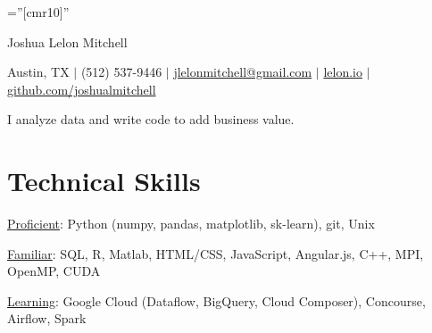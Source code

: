 \documentclass[a4paper,10pt]{article}
\begin{document}

\pagestyle{empty} %

\font\fb=''[cmr10]'' %

\par{\centering
		{\Huge Joshua Lelon Mitchell
	}\par}
\par{\centering
		{
	Austin, TX
	$\mid$
	(512) 537-9446
	$\mid$
	\href {mailto:jlelonmitchell@gmail.com}{jlelonmitchell@gmail.com}
	$\mid$
	\href {http://lelon.io/blog/2018/01/04/to-potential-employers}{lelon.io}
	$\mid$
	\href {https://github.com/joshualmitchell}{github.com/joshualmitchell}
}\par}

\begin{center}
I analyze data and write code to add business value.
\end{center}
\section{Technical Skills}

\underline{Proficient}: Python (numpy, pandas, matplotlib, sk-learn), git, Unix

\underline{Familiar}: SQL, R, Matlab, HTML/CSS, JavaScript, Angular.js, C++, MPI, OpenMP, CUDA

\underline{Learning}: Google Cloud (Dataflow, BigQuery, Cloud Composer), Concourse, Airflow, Spark

\end{document}
